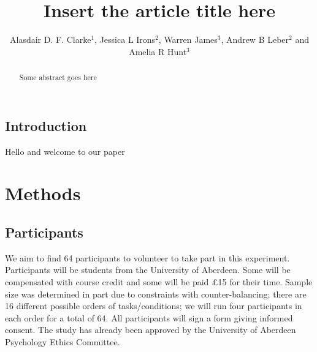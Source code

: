 \documentclass[]{rsos}%
\begin{document}
\linenumbers
\title{Insert the article title here}

\author{%
Alasdair D. F. Clarke$^1$, Jessica L Irons$^2$, Warren James$^3$, Andrew B Leber$^2$ and Amelia R Hunt$^3$}

\address{
$^{1}$Department of Psychology, University of Essex, Colchester, UK\\
$^{2}$Department of Psychology, The Ohio State Universoty, Columbus, USA\\
$^{3}$School of Psychology, University of Aberdeen, Aberdeen, UK
}

\subject{Behaviour, evolution}



\begin{abstract}
Some abstract goes here
\end{abstract}


\begin{fmtext}
\section{Introduction}
Hello and welcome to our paper
\end{fmtext}

\maketitle


\section{Methods}


\subsection{Participants}
We aim to find 64 participants to volunteer to take part in this experiment. Participants will be students from the University of Aberdeen. Some will be compensated with course credit and some will be paid \pounds 15 for their time. Sample size was determined in part due to constraints with counter-balancing; there are 16 different possible orders of tasks/conditions; we will run four participants in each order for a total of 64. All participants will sign a form giving informed consent. The study has already been approved by the University of Aberdeen Psychology Ethics Committee.
\end{document}
